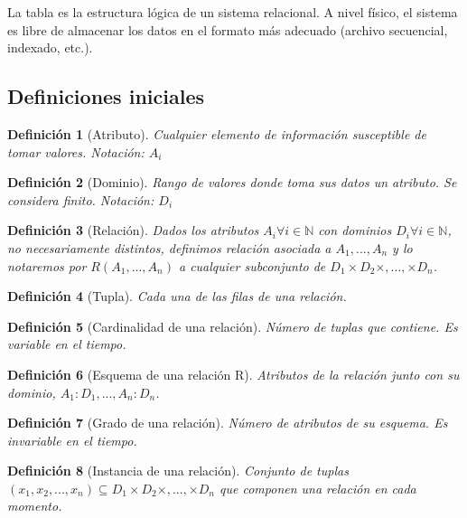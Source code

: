 \documentclass[12pt,spanish]{article}
\newtheorem{definition}{Definición}
\numberwithin{definition}{subsection}
\begin{document}
La tabla es la estructura lógica de un sistema relacional. A nivel físico, el sistema es libre de almacenar los datos en el formato más adecuado (archivo secuencial, indexado, etc.).
\subsection{Definiciones iniciales}

\begin{definition}[Atributo]
	Cualquier elemento de información susceptible de tomar valores. Notación: $A_i$
\end{definition}

\begin{definition}[Dominio]
	Rango de valores donde toma sus datos un atributo. Se considera finito. Notación: $D_i$
\end{definition}

\begin{definition}[Relación]
	Dados los atributos $A_i  \forall i \in \mathbb{N}$ con dominios $D_i  \forall i \in \mathbb{N}$, no necesariamente distintos, definimos relación asociada a $A_1,...,A_n$ y lo notaremos por $R(A_1,...,A_n)$ a cualquier subconjunto de $D_1 \times D_2 \times ,..., \times D_n$.
\end{definition}

\begin{definition}[Tupla]
	Cada una de las filas de una relación.
\end{definition}

\begin{definition}[Cardinalidad de una relación]
	Número de tuplas que contiene. Es variable en el tiempo.
\end{definition}


\begin{definition}[Esquema de una relación R]
	Atributos de la relación junto con su dominio, $A_1 : D_1,..., A_n : D_n$.
\end{definition}

\begin{definition}[Grado de una relación]
	Número de atributos de su esquema. Es invariable en el tiempo.
\end{definition}

\begin{definition}[Instancia de una relación]
	Conjunto de tuplas ${(x_1,x_2,...,x_n)} \subseteq D_1 \times D_2 \times ,..., \times D_n$ que componen una relación en cada momento.
\end{definition}
\end{document}
